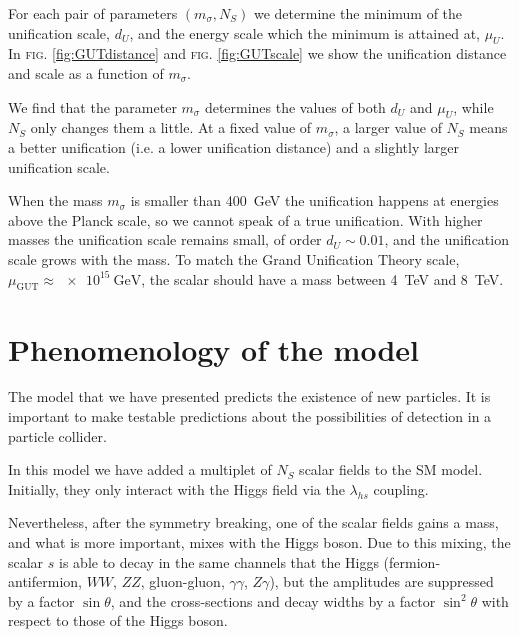 \documentclass[aps,prd,preprintnumbers,nofootinbibn,twocolumn]{revtex4}
\begin{document}
For each pair of parameters $(m_\sigma, N_S)$ we determine the minimum of the unification scale, $d_U$, and the energy scale which the minimum is attained at, $\mu_U$.  In \textsc{fig.} \ref{fig:GUTdistance} and \textsc{fig.} \ref{fig:GUTscale} we show the unification distance and scale as a function of $m_\sigma$.

We find that the parameter $m_\sigma$ determines the values of both $d_U$ and $\mu_U$, while $N_S$ only changes them a little. At a fixed value of $m_\sigma$, a larger value of $N_S$ means a better unification (i.e. a lower unification distance) and a slightly larger unification scale.


When the mass $m_\sigma$ is smaller than \SI{400}{\giga\electronvolt} the unification happens at energies above the Planck scale, so we cannot speak of a true unification. With higher masses the unification scale remains small, of order $d_U \sim 0.01$, and the unification scale grows with the mass. To match the Grand Unification Theory scale, $\mu_{\mathrm{GUT}}\approx \SI{e15}{\giga\electronvolt}$, the scalar should have a mass between \SI{4}{\tera\electronvolt} and \SI{8}{\tera\electronvolt}.



\section{Phenomenology of the model}\label{sect:pheno}

The model that we have presented predicts the existence of new particles. It is important to make testable predictions about the possibilities of detection in a particle collider.


In this model we have added a multiplet of $N_S$ scalar fields to the SM model. Initially, they only interact with the Higgs field via the $\lambda_{hs}$ coupling.

Nevertheless, after the symmetry breaking, one of the scalar fields gains a mass, and what is more important, mixes with the Higgs boson. Due to this mixing, the scalar $s$ is able to decay in the same channels that the Higgs (fermion-antifermion, $WW$, $ZZ$,  gluon-gluon, $\gamma\gamma$, $Z\gamma$), but the amplitudes are suppressed by a factor $\sin \theta$, and the cross-sections and decay widths by a factor $\sin^2\theta$ with respect to those of the Higgs boson.
\end{document}
